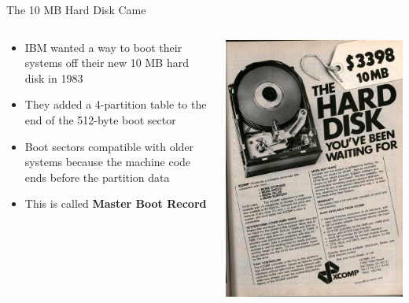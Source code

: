 \documentclass{lug}
\begin{document}
\begin{frame}{The 10 MB Hard Disk Came}
    \begin{columns}
        \begin{column}{0.7\textwidth}
            \begin{itemize}[<+->]
                \item IBM wanted a way to boot their systems off their new 10 MB hard
                    disk in 1983
                \item They added a 4-partition table to the end of the 512-byte boot
                    sector
                \item Boot sectors compatible with older systems because the machine
                    code ends before the partition data
                \item This is called \textbf{Master Boot Record}
            \end{itemize}
        \end{column}
        \begin{column}{0.3\textwidth}
            \includegraphics[width=\textwidth]{graphics/10mb}
        \end{column}
    \end{columns}
\end{frame}
\end{document}
